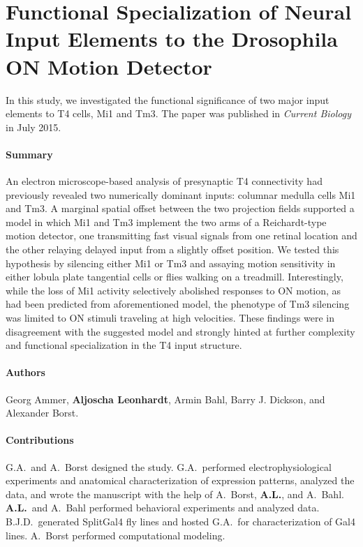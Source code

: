 \section{Functional Specialization of Neural Input Elements to the Drosophila ON Motion Detector}
\label{sct:manuscript_ammer}

In this study, we investigated the functional significance of two major input elements to T4 cells, Mi1 and Tm3. The paper was published in \textit{Current Biology} in July 2015.

\paragraph{Summary}
An electron microscope-based analysis of presynaptic T4 connectivity had previously revealed two numerically dominant inputs: columnar medulla cells Mi1 and Tm3. A marginal spatial offset between the two projection fields supported a model in which Mi1 and Tm3 implement the two arms of a Reichardt-type motion detector, one transmitting fast visual signals from one retinal location and the other relaying delayed input from a slightly offset position. We tested this hypothesis by silencing either Mi1 or Tm3 and assaying motion sensitivity in either lobula plate tangential cells or flies walking on a treadmill. Interestingly, while the loss of Mi1 activity selectively abolished responses to ON motion, as had been predicted from aforementioned model, the phenotype of Tm3 silencing was limited to ON stimuli traveling at high velocities. These findings were in disagreement with the suggested model and strongly hinted at further complexity and functional specialization in the T4 input structure.

\paragraph{Authors} Georg Ammer, \textbf{Aljoscha Leonhardt}, Armin Bahl, Barry J. Dickson, and Alexander Borst.

\paragraph{Contributions}
G.A.\ and A.\ Borst designed the study. G.A.\ performed electrophysiological experiments and anatomical characterization of expression patterns, analyzed the data, and wrote the manuscript with the help of A.\ Borst, \textbf{A.L.}, and A.\ Bahl. \textbf{A.L.}\ and A.\ Bahl performed behavioral experiments and analyzed data. B.J.D.\ generated SplitGal4 fly lines and hosted G.A.\ for characterization of Gal4 lines. A.\ Borst performed computational modeling.

\cleardoublepage

